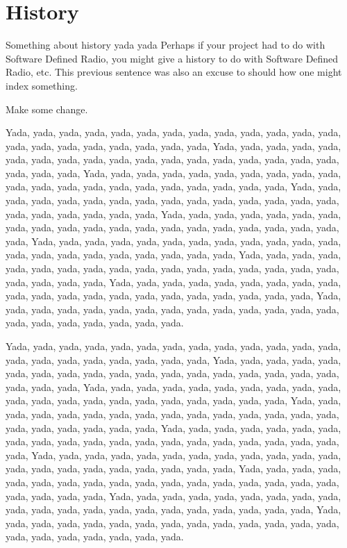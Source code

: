 
\section{History}
\label{chpIntro-secHistory}

Something about history yada yada\cite{AndreHabelLouchetRichter2013}
Perhaps if your project had to do with Software Defined Radio, you might give a history
to do with Software Defined Radio, etc. This previous sentence was also an excuse to should how one might index something.

Make some change.\cite{MischaSchwartz2005}

Yada, yada, yada, yada, yada, yada, yada, yada, yada, yada, yada, yada, yada, yada, yada, yada, yada, yada, yada, yada, yada,
Yada, yada, yada, yada, yada, yada, yada, yada, yada, yada, yada, yada, yada, yada, yada, yada, yada, yada, yada, yada, yada,
Yada, yada, yada, yada, yada, yada, yada, yada, yada, yada, yada, yada, yada, yada, yada, yada, yada, yada, yada, yada, yada,
Yada, yada, yada, yada, yada, yada, yada, yada, yada, yada, yada, yada, yada, yada, yada, yada, yada, yada, yada, yada, yada,
Yada, yada, yada, yada, yada, yada, yada, yada, yada, yada, yada, yada, yada, yada, yada, yada, yada, yada, yada, yada, yada,
Yada, yada, yada, yada, yada, yada, yada, yada, yada, yada, yada, yada, yada, yada, yada, yada, yada, yada, yada, yada, yada,
Yada, yada, yada, yada, yada, yada, yada, yada, yada, yada, yada, yada, yada, yada, yada, yada, yada, yada, yada, yada, yada,
Yada, yada, yada, yada, yada, yada, yada, yada, yada, yada, yada, yada, yada, yada, yada, yada, yada, yada, yada, yada, yada,
Yada, yada, yada, yada, yada, yada, yada, yada, yada, yada, yada, yada, yada, yada, yada, yada, yada, yada, yada, yada, yada.

Yada, yada, yada, yada, yada, yada, yada, yada, yada, yada, yada, yada, yada, yada, yada, yada, yada, yada, yada, yada, yada,
Yada, yada, yada, yada, yada, yada, yada, yada, yada, yada, yada, yada, yada, yada, yada, yada, yada, yada, yada, yada, yada,
Yada, yada, yada, yada, yada, yada, yada, yada, yada, yada, yada, yada, yada, yada, yada, yada, yada, yada, yada, yada, yada,
Yada, yada, yada, yada, yada, yada, yada, yada, yada, yada, yada, yada, yada, yada, yada, yada, yada, yada, yada, yada, yada,
Yada, yada, yada, yada, yada, yada, yada, yada, yada, yada, yada, yada, yada, yada, yada, yada, yada, yada, yada, yada, yada,
Yada, yada, yada, yada, yada, yada, yada, yada, yada, yada, yada, yada, yada, yada, yada, yada, yada, yada, yada, yada, yada,
Yada, yada, yada, yada, yada, yada, yada, yada, yada, yada, yada, yada, yada, yada, yada, yada, yada, yada, yada, yada, yada,
Yada, yada, yada, yada, yada, yada, yada, yada, yada, yada, yada, yada, yada, yada, yada, yada, yada, yada, yada, yada, yada,
Yada, yada, yada, yada, yada, yada, yada, yada, yada, yada, yada, yada, yada, yada, yada, yada, yada, yada, yada, yada, yada.

